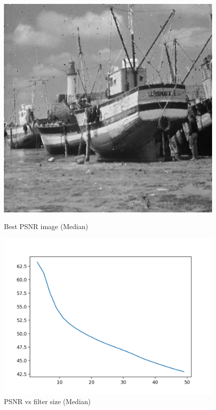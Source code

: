 \documentclass{article}
\begin{document}
    \begin{figure}[!htb]
      \includegraphics[scale=0.3]{./basic_denoising/boat/median_best_sp.png}
      \caption{Best PSNR image (Median)}
    \endminipage \hfill
      \includegraphics[scale=.45]{./basic_denoising/boat/median_psnr_sp.png}
      \caption{PSNR vs filter size (Median)}
    \endminipage
    \end{figure}
    \pagebreak
\end{document}
